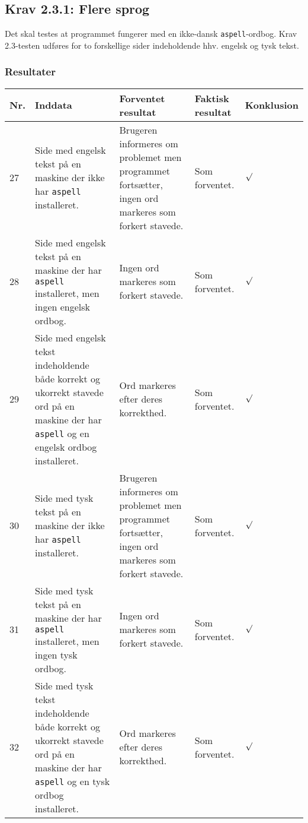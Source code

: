 \documentclass[a4paper,oneside,article]{memoir}
\begin{document}
\begin{landscape}
\subsection{Krav 2.3.1: Flere sprog}

Det skal testes at programmet fungerer med en ikke-dansk
\texttt{aspell}-ordbog. Krav 2.3-testen udføres for to forskellige
sider indeholdende hhv. engelsk og tysk tekst.

\subsubsection{Resultater}
\begin{longtable}[c]{p{20pt}|p{220pt}|p{130pt}|p{130pt}|p{50pt}}
\textbf{Nr.} &
\textbf{Inddata} &
\textbf{Forventet resultat} &
\textbf{Faktisk resultat} &
\textbf{Konklusion} \\ \hline

27 &
Side med engelsk tekst på en maskine der ikke har \texttt{aspell}
installeret. &
Brugeren informeres om problemet men programmet fortsætter, ingen ord
markeres som forkert stavede. &
Som forventet. &
$\surd$ \\ \hline

28 &
Side med engelsk tekst på en maskine der har \texttt{aspell}
installeret, men ingen engelsk ordbog. &
Ingen ord markeres som forkert stavede. &
Som forventet. &
$\surd$ \\ \hline

29 &
Side med engelsk tekst indeholdende både korrekt og ukorrekt stavede ord
på en maskine der har \texttt{aspell} og en engelsk ordbog
installeret. &
Ord markeres efter deres korrekthed. &
Som forventet. &
$\surd$ \\ \hline

30 &
Side med tysk tekst på en maskine der ikke har \texttt{aspell}
installeret. &
Brugeren informeres om problemet men programmet fortsætter, ingen ord
markeres som forkert stavede. &
Som forventet. &
$\surd$ \\ \hline

31 &
Side med tysk tekst på en maskine der har \texttt{aspell}
installeret, men ingen tysk ordbog. &
Ingen ord markeres som forkert stavede. &
Som forventet. &
$\surd$ \\ \hline

32 &
Side med tysk tekst indeholdende både korrekt og ukorrekt stavede ord
på en maskine der har \texttt{aspell} og en tysk ordbog installeret. &
Ord markeres efter deres korrekthed. &
Som forventet. &
$\surd$ \\ \hline


\end{longtable}
\end{landscape}
\end{document}

